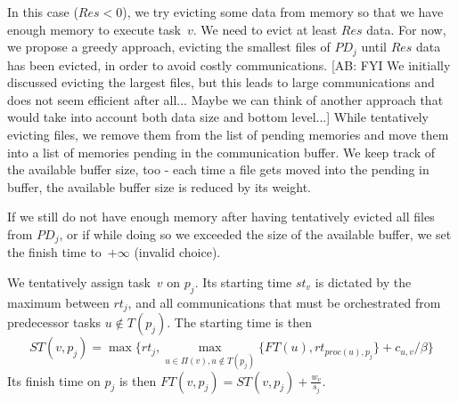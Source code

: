 \documentclass[conference]{IEEEtran}
\newcommand{\PD}{PD}
\newcommand{\AB}[1]{{\color{purple}[AB: #1]}}
\begin{document}
    In this case ($Res <0$), we try evicting
    some data from memory so that we have enough memory to execute task~$v$.
    We need to evict at least $Res$ data.
    For now, we propose a greedy approach, evicting the smallest files of $\PD_j$ until $Res$ data has been evicted,
    in order to avoid costly communications.
    \AB{FYI We initially discussed evicting the largest files, but this leads to
    large communications and does not seem efficient after all... Maybe we can think of another
    approach that would take into account both data size and bottom level...}
    While tentatively evicting files, we remove them from the list of pending memories and move them into a list
    of memories pending in the communication buffer.
    We keep track of the available buffer size, too - each time a file gets moved into the pending in buffer, the available buffer size is reduced by its weight.

    If we still do not have enough memory after having tentatively evicted all files from $\PD_j$,
    or if while doing so we exceeded the size of the available buffer,
    we set the finish time to~$+\infty$ (invalid choice).

    \smallskip
     We tentatively assign task~$v$ on $p_j$.
    Its starting time $st_v$ is dictated by the maximum between $rt_j$, and all communications that
    must be orchestrated from predecessor tasks $u\notin T(p_j)$.
    The starting time is then
    \[ST(v, p_j) = \max{ \{rt_j, \max_{ u \in \Pi(v), u\notin T(p_j)}\{ FT(u) , rt_{proc(u), p_j}\} + c_{u,v} / \beta \} } \]
    Its finish time on $p_j$ is then
    $FT(v,p_j) = ST(v, p_j) + \frac{w_v}{s_j}$.
\end{document}
